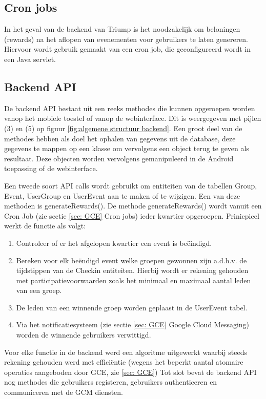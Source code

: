\subsection{Cron jobs}
In het geval van de backend van Triump is het noodzakelijk om beloningen (rewards) na het aflopen van evenementen voor gebruikers te laten genereren. Hiervoor wordt gebruik gemaakt van een cron job, die geconfigureerd wordt in een Java servlet.
\subsection{Backend API}
\label{backend API}
De backend API bestaat uit een reeks methodes die kunnen opgeroepen worden vanop het mobiele toestel of vanop de webinterface. Dit is weergegeven met pijlen (3) en (5) op figuur \ref{fig:algemene structuur backend}. Een groot deel van de methodes hebben als doel het ophalen van gegevens uit de database, deze gegevens te mappen op een klasse om vervolgens een object terug te geven als resultaat. Deze objecten worden vervolgens gemanipuleerd in de Android toepassing of de webinterface.

Een tweede soort API calls wordt gebruikt om entiteiten van de tabellen Group, Event, UserGroup en UserEvent aan te maken of te wijzigen. Een van deze methoden is generateRewards(). De methode generateRewards() wordt vanuit een Cron Job (zie sectie \ref{sec: GCE} Cron jobs) ieder kwartier opgeroepen. Prinicpieel werkt de functie als volgt:
\begin{enumerate}
	\item Controleer of er het afgelopen kwartier een event is beëindigd.
	\item Bereken voor elk beëndigd event welke groepen gewonnen zijn a.d.h.v. de tijdstippen van de Checkin entiteiten. Hierbij wordt er rekening gehouden met participatievoorwaarden zoals het minimaal en maximaal aantal leden van een groep.
	\item De leden van een winnende groep worden geplaast in de UserEvent tabel.
	\item Via het notificatiesysteem (zie sectie \ref{sec: GCE} Google Cloud Messaging) worden de winnende gebruikers verwittigd.
\end{enumerate}
Voor elke functie in de backend werd een algoritme uitgewerkt waarbij steeds rekening gehouden werd met efficiëntie (wegens het beperkt aantal atomaire operaties aangeboden door GCE, zie \ref{sec: GCE})
Tot slot bevat de backend API nog methodes die gebruikers registeren, gebruikers authenticeren en communiceren met de GCM diensten. 

